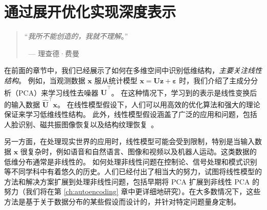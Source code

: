 \documentclass[../../book-main.tex]{subfiles}
\begin{document}
\chapter{通过展开优化实现深度表示}
\label{ch:representation}
\label{ch:unrolling}

\begin{quote}
\hfill    ``{\em 我所不能创造的，我就不理解}。''

$~$ \hfill --- 理查德·费曼
\end{quote}
\vspace{5mm}




在前面的章节中，我们已经展示了如何在多维空间中识别低维结构，\textit{主要关注线性结构}。
例如，当观测数据 $\bm{x}$ 服从统计模型 $\bm{x} = \bm{U}\bm{z} + \bm{\varepsilon}$ 时，我们介绍了主成分分析（PCA）来学习线性去噪器 $\hat{\bm{U}}^{\top}$。
在这种情况下，学习到的表示是线性变换后的输入数据 $\hat{\bm{U}}^{\top}\bm{x}$。
在线性模型假设下，人们可以用高效的优化算法和强大的理论保证来学习低维线性结构。
此外，线性模型假设涵盖了广泛的应用和问题，包括人脸识别、磁共振图像恢复以及结构纹理恢复~\cite{Wright-Ma-2022}。

另一方面，在处理现实世界的应用时，线性模型可能会受到限制，特别是当输入数据 $\bm{x}$ 很复杂时，例如语音和自然语言、图像和视频以及机器人运动。这类数据的低维分布通常是非线性的。
如何处理非线性问题在控制论、信号处理和模式识别等不同学科中有着悠久的历史。人们已经付出了相当大的努力，试图将线性模型的方法和解决方案扩展到处理非线性问题，包括早期将 PCA 扩展到非线性 PCA 的努力（我们将在第 \ref{ch:autoencoding} 章中更详细地研究）。在大多数情况下，这些方法是基于关于数据分布的某些假设而设计的，并针对特定问题量身定制。
\end{document}
